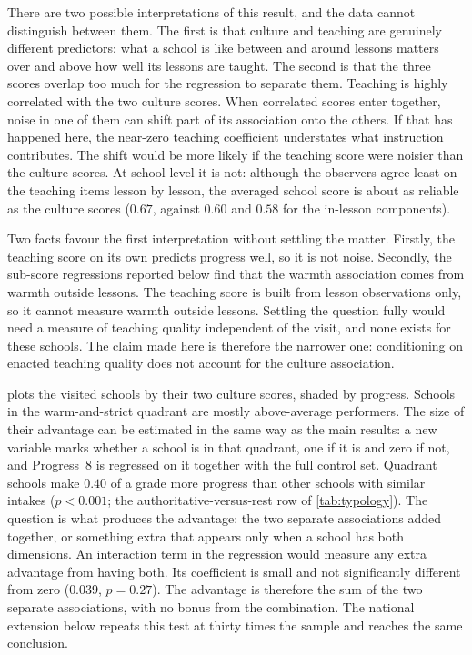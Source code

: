 There are two possible interpretations of this result, and the data cannot distinguish between them. The first is that culture and teaching are genuinely different predictors: what a school is like between and around lessons matters over and above how well its lessons are taught. The second is that the three scores overlap too much for the regression to separate them. Teaching is highly correlated with the two culture scores. When correlated scores enter together, noise in one of them can shift part of its association onto the others. If that has happened here, the near-zero teaching coefficient understates what instruction contributes. The shift would be more likely if the teaching score were noisier than the culture scores. At school level it is not: although the observers agree least on the teaching items lesson by lesson, the averaged school score is about as reliable as the culture scores ($0.67$, against $0.60$ and $0.58$ for the in-lesson components).

Two facts favour the first interpretation without settling the matter. Firstly, the teaching score on its own predicts progress well, so it is not noise. Secondly, the sub-score regressions reported below find that the warmth association comes from warmth outside lessons. The teaching score is built from lesson observations only, so it cannot measure warmth outside lessons. Settling the question fully would need a measure of teaching quality independent of the visit, and none exists for these schools. The claim made here is therefore the narrower one: conditioning on enacted teaching quality does not account for the culture association.



 plots the visited schools by their two culture scores, shaded by progress. Schools in the warm-and-strict quadrant are mostly above-average performers. The size of their advantage can be estimated in the same way as the main results: a new variable marks whether a school is in that quadrant, one if it is and zero if not, and Progress~8 is regressed on it together with the full control set. Quadrant schools make $0.40$ of a grade more progress than other schools with similar intakes ($p < 0.001$; the authoritative-versus-rest row of \cref{tab:typology}). The question is what produces the advantage: the two separate associations added together, or something extra that appears only when a school has both dimensions. An interaction term in the regression would measure any extra advantage from having both. Its coefficient is small and not significantly different from zero ($0.039$, $p = 0.27$). The advantage is therefore the sum of the two separate associations, with no bonus from the combination. The national extension below repeats this test at thirty times the sample and reaches the same conclusion.

